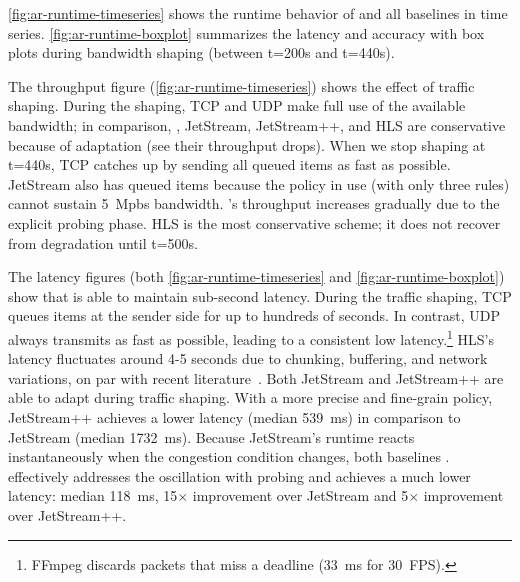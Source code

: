  \autoref{fig:ar-runtime-timeseries} shows the runtime behavior
of \sysname{} and all baselines in time series. \autoref{fig:ar-runtime-boxplot}
summarizes the latency and accuracy with box plots during bandwidth shaping
(between t=200s and t=440s).

The throughput figure (\autoref{fig:ar-runtime-timeseries}) shows the effect of
traffic shaping. During the shaping, TCP and UDP make full use of the available
bandwidth; in comparison, \sysname{}, JetStream, JetStream++, and HLS are
conservative because of adaptation (see their throughput drops). When we stop
shaping at t=440s, TCP catches up by sending all queued items as fast as
possible. JetStream also has queued items because the policy in use (with only
three rules) cannot sustain \SI{5}{Mpbs} bandwidth. \sysname{}'s throughput
increases gradually due to the explicit probing phase. HLS is the most
conservative scheme; it does not recover from degradation until t=500s.


The latency figures (both \autoref{fig:ar-runtime-timeseries} and
\autoref{fig:ar-runtime-boxplot}) show that \sysname{} is able to maintain
sub-second latency. During the traffic shaping, TCP queues items at the sender
side for up to hundreds of seconds. In contrast, UDP always transmits as fast as
possible, leading to a consistent low latency.\footnote{FFmpeg discards packets
  that miss a deadline (\SI{33}{\ms} for \SI{30}{FPS}).} HLS's latency
fluctuates around 4-5 seconds due to chunking, buffering, and network
variations, on par with recent literature~\cite{wang2016anatomy}. Both JetStream
and JetStream++ are able to adapt during traffic shaping. With a more precise
and fine-grain policy, JetStream++ achieves a lower latency (median
\SI{539}{\ms}) in comparison to JetStream (median \SI{1732}{\ms}). Because
JetStream's runtime reacts instantaneously when the congestion condition
changes, both baselines . \sysname{} effectively
addresses the oscillation with probing and achieves a much lower latency: median
\SI{118}{\ms}, 15$\times$ improvement over JetStream and 5$\times$ improvement
over JetStream++.

